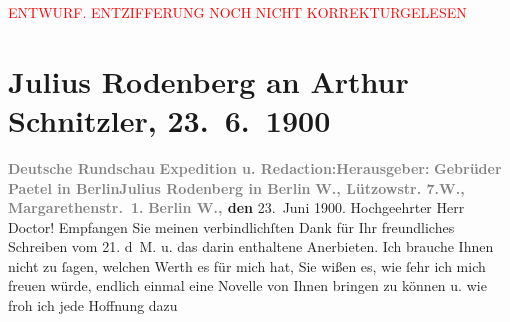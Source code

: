 
\begin{center}
            \textcolor{red}{ENTWURF. ENTZIFFERUNG NOCH NICHT KORREKTURGELESEN}
                      \end{center}
            
               \section[Julius Rodenberg an Arthur Schnitzler, 23. 6. 1900]{ Julius Rodenberg an Arthur Schnitzler, 23. 6. 1900}\nopagebreak{}\rehead{ }\begin{ledgroupsized}[t]{13cm}\normalsize\beginnumbering{} \toendnotes[C]{\smallbreak\pagebreak[2]} 
\toendnotes[C]{\smallbreak}\pstart
           \noindent{}\centering{}{\pb}\textcolor{gray}{\textbf{Deutsche Rundschau}}\pend
           \pstart
           \noindent{}\textcolor{gray}{\textbf{Expedition u. Redaction:}}\hfill \textcolor{gray}{\textbf{Herausgeber:}}\pend
           \pstart
           \textcolor{gray}{\textbf{Gebrüder Paetel in Berlin}}\hfill \textcolor{gray}{\textbf{Julius Rodenberg in Berlin}}\pend
           \pstart
           \textcolor{gray}{\textbf{W., Lützowstr. 7.}}\hfill \textcolor{gray}{\textbf{W., Margarethenstr. 1.}}\pend
           \pstart
           \raggedleft{}\textbf{\textcolor{gray}{\textbf{Berlin W.,}} den}{ }23. Juni 1900.\pend
           \pstart{}Hochgeehrter Herr Doctor!\pend\pstart
           Empfangen Sie meinen verbindlichſten Dank für Ihr freundliches Schreiben vom
                        21. d M. u. das darin enthaltene Anerbieten. Ich brauche Ihnen
                    nicht zu ſagen, welchen Werth es für mich hat, Sie wißen es, wie ſehr ich mich
                    freuen würde, endlich einmal eine Novelle von Ihnen bringen zu können u. wie froh ich jede Hoffnung dazu

\end{ledgroupsized}
